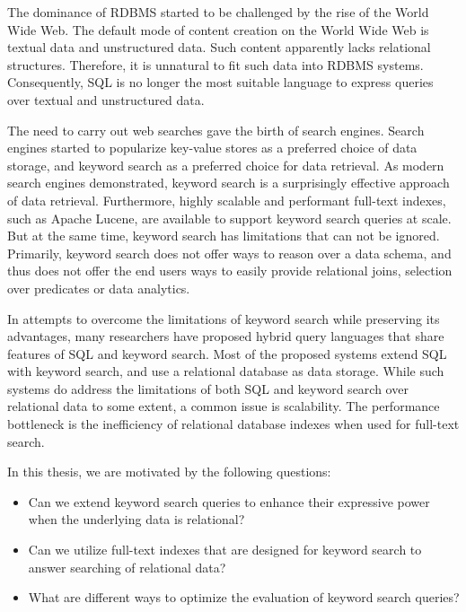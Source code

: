 The dominance of RDBMS started to be challenged by the rise of the World Wide Web. The default mode of content creation on the World Wide Web is textual data and unstructured data. Such content apparently lacks relational structures. Therefore, it is unnatural to fit such data into RDBMS systems. Consequently, SQL is no longer the most suitable language to express queries over textual and unstructured data.

The need to carry out web searches gave the birth of search engines. Search engines started to popularize key-value stores as a preferred choice of data storage, and keyword search as a preferred choice for data retrieval.  As modern search engines demonstrated, keyword search is a surprisingly effective approach of data retrieval. Furthermore, highly scalable and performant full-text indexes, such as Apache Lucene, are available to support keyword search queries at scale. But at the same time, keyword search has limitations that can not be ignored. Primarily, keyword search does not offer ways to reason over a data schema, and thus does not offer the end users ways to easily provide relational joins, selection over predicates or data analytics.

In attempts to overcome the limitations of keyword search while preserving its advantages, many researchers have proposed hybrid query languages that share features of SQL and keyword search.  Most of the proposed systems extend SQL with keyword search, and use a relational database as data storage. While such systems do address the limitations of both SQL and keyword search over relational data to some extent, a common issue is scalability. The performance bottleneck is the inefficiency of relational database indexes when used for full-text search.

In this thesis, we are motivated by the following questions:

\begin{itemize}
\item Can we extend keyword search queries to enhance their expressive power when the underlying data is relational?

\item Can we utilize full-text indexes that are designed for keyword search to answer searching of relational data?

\item What are different ways to optimize the evaluation of keyword search queries?
\end{itemize}

